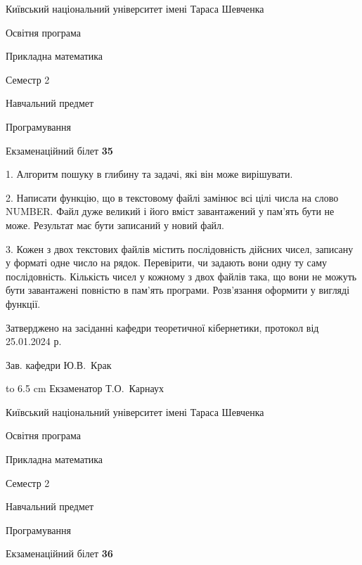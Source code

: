 \documentclass[12pt, ukrainian]{article}
\begin{document}
\vspace{0.9cm}
{{\begin {scriptsize}\par
{ \center  Київський національний університет імені Тараса Шевченка \par}
{\parbox {5 cm}{Освітня програма \hfill}{\parbox {7 cm}{Прикладна математика\hfill}}\parbox {6 cm}{\hfill Семестр 2}}\par
{\parbox {5 cm} {Навчальний предмет \hfill}\parbox {7 cm}{Програмування \hfill}\parbox {6cm}{\hfill}\par}\vspace{-15pt} \end{scriptsize}}{\center Екзаменаційний білет \No \textbf { 35 }\par}}
{%
1. Алгоритм пошуку в глибину та задачі, які він може вирішувати.%
\par
2. Написати функцію, що в текстовому файлі замінює всі цілі числа на слово NUMBER. Файл дуже великий і його вміст завантажений у пам'ять бути не може. Результат має бути записаний у новий файл.

\par
3. Кожен з двох текстових файлів містить послідовність дійсних чисел, записану у форматі одне число на рядок.  Перевірити, чи задають вони одну ту саму послідовність. Кількість чисел у кожному з двох файлів така, що вони не можуть бути завантажені повністю в пам'ять програми. Розв'язання оформити у вигляді функції.

}
{\smallskip\smallskip \begin {scriptsize} Затверджено на засіданні кафедри теоретичної кібернетики, протокол   від   25.01.2024 р.\par\smallskip\smallskip\smallskip\smallskip
{\parbox {6.5 cm} {Зав. кафедри \dotfill Ю.В.~Крак}}\hspace {0.7cm} {\hbox to 6.5 cm { Екзаменатор \dotfill Т.О.~Карнаух}} \end{scriptsize}}
\vspace{0.9cm}
{{\begin {scriptsize}\par
{ \center  Київський національний університет імені Тараса Шевченка \par}
{\parbox {5 cm}{Освітня програма \hfill}{\parbox {7 cm}{Прикладна математика\hfill}}\parbox {6 cm}{\hfill Семестр 2}}\par
{\parbox {5 cm} {Навчальний предмет \hfill}\parbox {7 cm}{Програмування \hfill}\parbox {6cm}{\hfill}\par}\vspace{-15pt} \end{scriptsize}}{\center Екзаменаційний білет \No \textbf { 36 }\par}}
\end{document}
